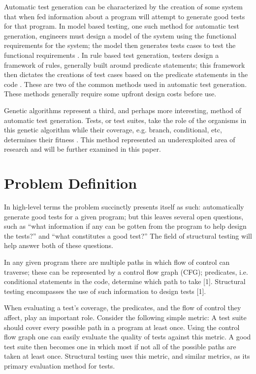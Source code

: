 \documentclass[runningheads]{llncs}
\begin{document}
Automatic test generation can be characterized by the creation of some system that when fed information about a program will attempt to generate good tests for that program. In model based testing, one such method for automatic test generation, engineers must design a model of the system using the functional requirements for the system; the model then generates tests cases to test the functional requirements \cite{model2}. In rule based test generation, testers design a framework of rules, generally built around predicate statements; this framework then dictates the creations of test cases based on the predicate statements in the code \cite{chang3}. These are two of the common methods used in automatic test generation. These methods generally require some upfront design costs before use. 

Genetic algorithms represent a third, and perhaps more interesting, method of automatic test generation. Tests, or test suites, take the role of the organisms in this genetic algorithm while their coverage, e.g. branch, conditional, etc, determines their fitness \cite{sthammer4}. This method represented an underexploited area of research and will be further examined in this paper. 

\newpage
\section{Problem Definition}
In high-level terms the problem succinctly presents itself as such: automatically generate good tests for a given program; but this leaves several open questions, such as ``what information if any can be gotten from the program to help design the tests?'' and ``what constitutes a good test?'' The field of structural testing will help answer both of these questions.

In any given program there are multiple paths in which flow of control can traverse; these can be represented by a control flow graph (CFG); predicates, i.e. conditional statements in the code, determine which path to take [1]. Structural testing encompasses the use of such information to design tests [1].

When evaluating a test's coverage, the predicates, and the flow of control they affect, play an important role. Consider the following simple metric: A test suite should cover every possible path in a program at least once. Using the control flow graph one can easily evaluate the quality of tests against this metric. A good test suite then becomes one in which most if not all of the possible paths are taken at least once. Structural testing uses this metric, and similar metrics, as its primary evaluation method for tests.
\end{document}
